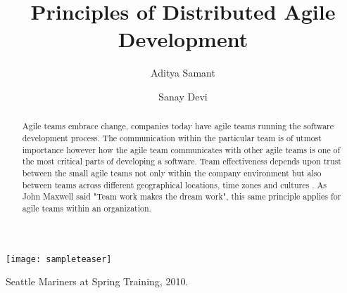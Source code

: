 \documentclass[sigplan,screen]{acmart}
\begin{document}
%
\title{Principles of Distributed Agile Development}

%

\author{Aditya Samant}

\author{Sanay Devi}


%

%
\begin{abstract}
Agile teams embrace change, companies today have agile teams running the software development process. The communication within the particular team is of utmost importance however how the agile team communicates with other agile teams is one of the most critical parts of developing a software. Team effectiveness depends upon trust between the small agile teams not only within the company environment but also between teams across different geographical locations, time zones and cultures \cite{Siva13}. As John Maxwell said "Team work makes the dream work", this same principle applies for agile teams within an organization. 
\end{abstract}


%

%
\begin{teaserfigure}
  \texttt{[image: sampleteaser]}
  \caption{Seattle Mariners at Spring Training, 2010.}
  \label{fig:teaser}
\end{teaserfigure}
\end{document}
